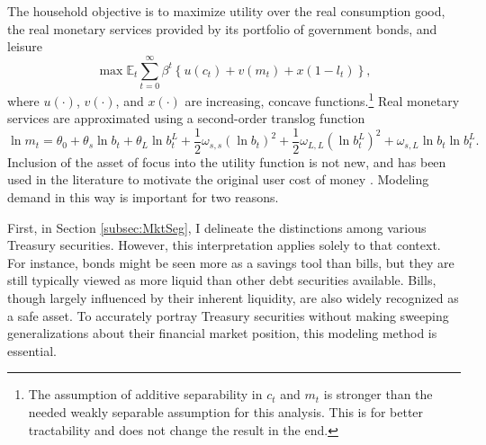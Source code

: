 \documentclass[11pt,a4paper,margin=1.5in]{article}
\begin{document}
The household objective is to maximize utility over the real consumption good, the real monetary services provided by its portfolio of government bonds, and leisure
\begin{equation}
	\max\mathbb{E}_t\! \sum^\infty_{t=0} \beta^t\left\{u(c_t) + v\left(m_t\right) + x(1-l_t)\right\},
	\label{eq:HH_Utility}
\end{equation}
where $u(\cdot)$, $v(\cdot)$, and $x(\cdot)$ are increasing, concave functions.\footnote{
	The assumption of additive separability in $c_t$ and $m_t$ is stronger than the needed weakly separable assumption for this analysis.
	This is for better tractability and does not change the result in the end.}
Real monetary services are approximated using a second-order translog function
\begin{equation}
	\ln m_t = \theta_0 + \theta_s \ln b_t + \theta_L \ln b^L_t + \frac{1}{2}\omega_{s,s} \left(\ln b_t\right)^2 + \frac{1}{2}\omega_{L,L} \left(\ln b^L_t\right)^2 + \omega_{s,L}\ln b_t \ln b^L_t.
	\label{eq:HH_MonServices}
\end{equation}
Inclusion of the asset of focus into the utility function is not new, and has been used in the literature to motivate the original user cost of money \citep{Barnett:1978}.
Modeling demand in this way is important for two reasons.

First, in Section \ref{subsec:MktSeg}, I delineate the distinctions among various Treasury securities. 
However, this interpretation applies solely to that context. 
For instance, bonds might be seen more as a savings tool than bills, but they are still typically viewed as more liquid than other debt securities available. 
Bills, though largely influenced by their inherent liquidity, are also widely recognized as a safe asset. 
To accurately portray Treasury securities without making sweeping generalizations about their financial market position, this modeling method is essential.
\end{document}
